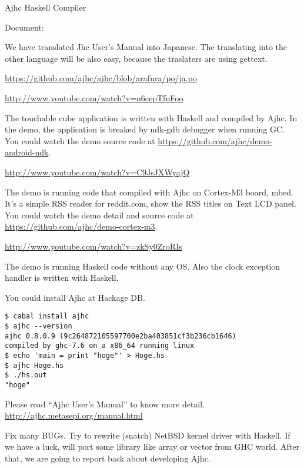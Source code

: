 \documentclass[DIV16,twocolumn,10pt]{scrreprt}
\begin{document}
\begin{hcarentry}{Ajhc Haskell Compiler}
\vspace*{10pt}

\noindent Document:

We have translated Jhc User's Manual into Japanese.
The translating into the other language will be also easy,
because the traslaters are using gettext.

\noindent \url{https://github.com/ajhc/ajhc/blob/arafura/po/ja.po}

\Demo

\noindent \url{http://www.youtube.com/watch?v=n6cepTfnFoo}

The touchable cube application is written with Haskell and compiled by Ajhc.
In the demo, the application is breaked by ndk-gdb debugger when running GC.
You could watch the demo source code at \url{https://github.com/ajhc/demo-android-ndk}.

\vspace*{10pt}

\noindent \url{http://www.youtube.com/watch?v=C9JsJXWyajQ}

The demo is running code that compiled with Ajhc on Cortex-M3 board, mbed. It's a simple RSS reader for reddit.com, show the RSS titles on Text LCD panel. You could watch the demo detail and source code at \url{https://github.com/ajhc/demo-cortex-m3}.

\vspace*{10pt}

\noindent \url{http://www.youtube.com/watch?v=zkSy0ZroRIs}

The demo is running Haskell code without any OS.
Also the clock exception handler is written with Haskell.

\Usage

You could install Ajhc at Hackage DB.

\begin{verbatim}
$ cabal install ajhc
$ ajhc --version
ajhc 0.8.0.9 (9c264872105597700e2ba403851cf3b236cb1646)
compiled by ghc-7.6 on a x86_64 running linux
$ echo 'main = print "hoge"' > Hoge.hs
$ ajhc Hoge.hs
$ ./hs.out
"hoge"
\end{verbatim}

Please read ``Ajhc User's Manual'' to know more detail. \url{http://ajhc.metasepi.org/manual.html}

\FuturePlans

Fix many BUGs. Try to rewrite (snatch) NetBSD kernel driver with Haskell. If we have a luck, will port some library like array or vector from GHC world. After that, we are going to report back about developing Ajhc.


\end{hcarentry}
\end{document}
